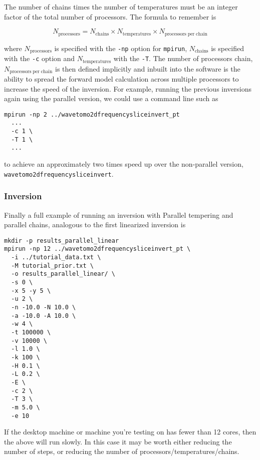 \documentclass[a4paper,12pt]{article}
\begin{document}
The number of chains times the number of temperatures must be an
integer factor of the total number of processors. The formula
to remember is

\begin{equation}
  N_{\mathrm{processors}} = N_{\mathrm{chains}} \times
  N_{\mathrm{temperatures}} \times N_{\mathrm{processors\; per\; chain}}
\end{equation}

where $N_{\mathrm{processors}}$ is specified with the {\tt -np} option
for {\tt mpirun}, $N_{\mathrm{chains}}$ is specified with the {\tt -c}
option and $N_{\mathrm{temperatures}}$ with the {\tt -T}.  The number
of processors chain, $N_{\mathrm{processors\; per\; chain}}$ is then
defined implicitly and inbuilt into the software is the ability to
spread the forward model calculation across multiple processors to
increase the speed of the inversion. For example, running the previous
inversions again using the parallel version, we could use a command
line such as

\begin{verbatim}
mpirun -np 2 ../wavetomo2dfrequencysliceinvert_pt 
  ...
  -c 1 \
  -T 1 \
  ...
\end{verbatim}

to achieve an approximately two times speed up over the
non-parallel version, {\tt wavetomo2dfrequencysliceinvert}.

\subsubsection{Inversion}

Finally a full example of running an inversion with Parallel tempering and
parallel chains, analogous to the first linearized inversion is

\begin{verbatim}
mkdir -p results_parallel_linear
mpirun -np 12 ../wavetomo2dfrequencysliceinvert_pt \
  -i ../tutorial_data.txt \
  -M tutorial_prior.txt \
  -o results_parallel_linear/ \
  -s 0 \
  -x 5 -y 5 \
  -u 2 \
  -n -10.0 -N 10.0 \
  -a -10.0 -A 10.0 \
  -w 4 \
  -t 100000 \
  -v 10000 \
  -l 1.0 \
  -k 100 \
  -H 0.1 \
  -L 0.2 \
  -E \
  -c 2 \
  -T 3 \
  -m 5.0 \
  -e 10  
\end{verbatim}

If the desktop machine or machine you're testing on has fewer than 12 cores, then
the above will run slowly. In this case it may be worth either reducing the
number of steps, or reducing the number of processors/temperatures/chains.
\end{document}
